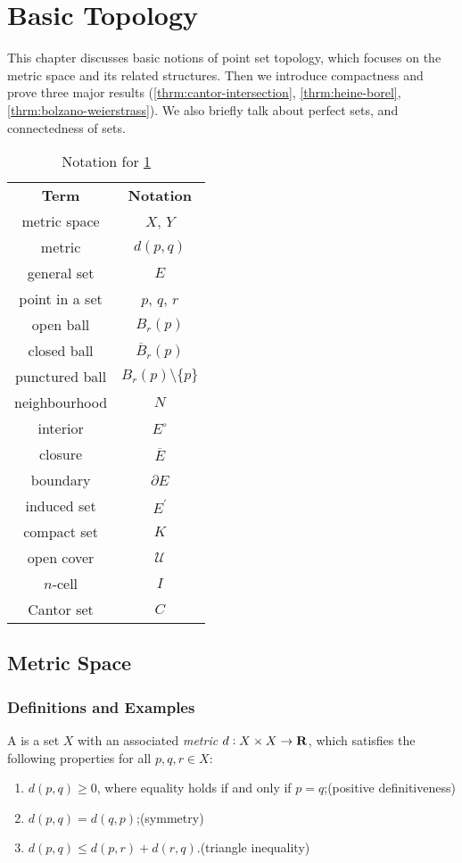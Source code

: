 \chapter{Basic Topology}\label{chap:basic-topology}
This chapter discusses basic notions of point set topology, which focuses on the metric space and its related structures. Then we introduce compactness and prove three major results (\cref{thrm:cantor-intersection}, \cref{thrm:heine-borel}, \cref{thrm:bolzano-weierstrass}). We also briefly talk about perfect sets, and connectedness of sets.

\begin{table}[H]
\centering
\begin{tabular}{cc}
\textbf{Term} & \textbf{Notation}\\
metric space & $X$, $Y$\\
metric & $d(p,q)$\\
general set & $E$\\
point in a set & $p$, $q$, $r$\\
open ball & $B_r(p)$\\
closed ball & $\overline{B}_r(p)$\\
punctured ball & $B_r(p)\setminus\{p\}$\\
neighbourhood & $N$\\
interior & $E^\circ$\\
closure & $\overline{E}$\\
boundary & $\partial E$\\
induced set & $E^\prime$\\
compact set & $K$\\
open cover & $\mathcal{U}$\\
$n$-cell & $I$\\
Cantor set & $C$
\end{tabular}
\caption{Notation for \cref{chap:basic-topology}}
\end{table}

\section{Metric Space}
\subsection{Definitions and Examples}
\begin{definition}
A  is a set $X$ with an associated \emph{metric} $d:X\times X\to\mathbf R$, which satisfies the following properties for all $p,q,r\in X$:
\begin{enumerate}[label=(\roman*)]
\item $d(p,q)\ge0$, where equality holds if and only if $p=q$;\hfill(positive definitiveness)
\item $d(p,q)=d(q,p)$;\hfill(symmetry)
\item $d(p,q)\le d(p,r)+d(r,q)$.\hfill(triangle inequality)
\end{enumerate}
\end{definition}

